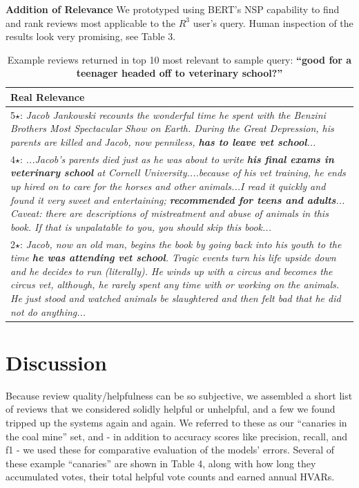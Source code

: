 \documentclass[10pt, a4paper, twocolumn]{article}
\begin{document}
\noindent
\textbf{Addition of Relevance}
We prototyped using BERT’s NSP capability to find and rank reviews most applicable to the $R^3$ user’s query. Human inspection of the results look very promising, see Table 3.

\begin{table}[ht]
\begin{tabular}{ | p{7cm} | }
  \hline
  \textbf{Real Relevance}  \\
  \hline
  5$\star$: \textit{Jacob Jankowski recounts the wonderful time he spent with the Benzini Brothers Most Spectacular Show on Earth. During the Great Depression, his parents are killed and Jacob, now penniless, \textbf{has to leave vet school}...} \\
   \hline
  4$\star$: \textit{...Jacob's parents died just as he was about to write \textbf{his final exams in veterinary school} at Cornell University....because of his vet training, he ends up hired on to care for the horses and other animals...I read it quickly and found it very sweet and entertaining; \textbf{recommended for teens and adults}... Caveat: there are descriptions of mistreatment and abuse of animals in this book. If that is unpalatable to you, you should skip this book...} \\
   \hline
  2$\star$: \textit{Jacob, now an old man, begins the book by going back into his youth to the time \textbf{he was attending vet school}.  Tragic events turn his life upside down and he decides to run (literally).  He winds up with a circus and becomes the circus vet, although, he rarely spent any time with or working on the animals. He just stood and watched animals be slaughtered and then felt bad that he did not do anything...}\\
  \hline
\end{tabular}
\caption{Example reviews returned in top 10 most relevant to sample query:
 \textbf{“good for a teenager headed off to veterinary school?”}}
\end{table}

\section{Discussion}
Because review quality/helpfulness can be so subjective, we assembled a short list of reviews that we considered solidly helpful or unhelpful, and a few we found tripped up the systems again and again. We referred to these as our “canaries in the coal mine” set, and - in addition to accuracy scores like precision, recall, and f1 - we used these for comparative evaluation of the models’ errors.  Several of these example “canaries” are shown in Table 4, along with how long they accumulated votes, their total helpful vote counts and earned annual HVARs.
\end{document}
